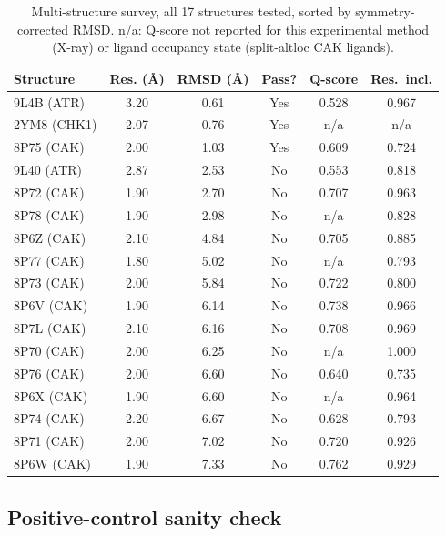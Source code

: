 \documentclass[global,twocolumn]{svjour}
\newcommand{\st}{\footnotesize\setlength{\tabcolsep}{3pt}}
\begin{document}
\begin{table}[t]
\centering
\caption{Multi-structure survey, all 17 structures tested, sorted by
symmetry-corrected RMSD. n/a: Q-score not reported for this experimental
method (X-ray) or ligand occupancy state (split-altloc CAK ligands).}
\label{tab:survey}
\st
\begin{tabular}{lccccc}
\toprule
Structure & Res. (\AA{}) & RMSD (\AA{}) & Pass? & Q-score & Res.\ incl. \\
\midrule
9L4B (ATR)  & 3.20 & 0.61 & Yes & 0.528 & 0.967 \\
2YM8 (CHK1) & 2.07 & 0.76 & Yes & n/a   & n/a   \\
8P75 (CAK)  & 2.00 & 1.03 & Yes & 0.609 & 0.724 \\
9L40 (ATR)  & 2.87 & 2.53 & No  & 0.553 & 0.818 \\
8P72 (CAK)  & 1.90 & 2.70 & No  & 0.707 & 0.963 \\
8P78 (CAK)  & 1.90 & 2.98 & No  & n/a   & 0.828 \\
8P6Z (CAK)  & 2.10 & 4.84 & No  & 0.705 & 0.885 \\
8P77 (CAK)  & 1.80 & 5.02 & No  & n/a   & 0.793 \\
8P73 (CAK)  & 2.00 & 5.84 & No  & 0.722 & 0.800 \\
8P6V (CAK)  & 1.90 & 6.14 & No  & 0.738 & 0.966 \\
8P7L (CAK)  & 2.10 & 6.16 & No  & 0.708 & 0.969 \\
8P70 (CAK)  & 2.00 & 6.25 & No  & n/a   & 1.000 \\
8P76 (CAK)  & 2.00 & 6.60 & No  & 0.640 & 0.735 \\
8P6X (CAK)  & 1.90 & 6.60 & No  & n/a   & 0.964 \\
8P74 (CAK)  & 2.20 & 6.67 & No  & 0.628 & 0.793 \\
8P71 (CAK)  & 2.00 & 7.02 & No  & 0.720 & 0.926 \\
8P6W (CAK)  & 1.90 & 7.33 & No  & 0.762 & 0.929 \\
\bottomrule
\end{tabular}
\end{table}
\FloatBarrier

\subsection{Positive-control sanity check}
\end{document}
